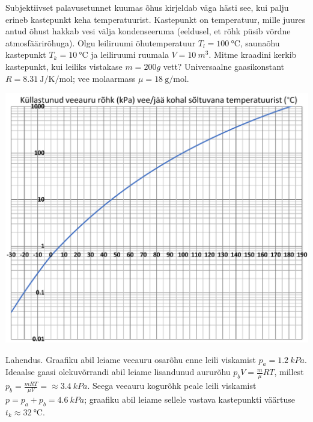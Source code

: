 
Subjektiivset palavusetunnet kuumas õhus kirjeldab väga hästi see, kui palju erineb kastepunkt keha temperatuurist. Kastepunkt on temperatuur, mille juures antud õhust hakkab vesi välja kondenseeruma (eeldusel, et rõhk püsib võrdne atmosfäärirõhuga). Olgu leiliruumi õhutemperatuur $T_l=\SI{100}{\celsius}$, saunaõhu kastepunkt $T_k=\SI{10}{\celsius}$ ja leiliruumi ruumala $V=\SI{10}{m^3}$. Mitme kraadini kerkib kastepunkt, kui leiliks vistakase $m=\SI{200}g$ vett? Universaalne gaasikonstant $R=\SI{8.31}{\joule\per\kelvin\per\mole}$; vee molaarmass $\mu=\SI{18}{\gram \per \mole}$.
\begin{center}
    \includegraphics[width=\textwidth]{2022-lahg-06-yl.pdf}
\end{center}




\hint

\solu
Lahendus. Graafiku abil leiame veeauru osarõhu enne leili viskamist $p_a=\SI{1.2}{kPa}$. Ideaalse gaasi olekuvõrrandi abil leiame lisandunud aururõhu $p_bV=\frac m\mu RT$, millest $p_b=\frac {mRT}{\mu V}=\approx \SI{3.4}{kPa}$. Seega veeauru kogurõhk peale leili viskamist $p=p_a+p_b=\SI{4.6}{kPa}$; graafiku abil leiame sellele vastava kastepunkti väärtuse $t_k\approx \SI{32}\celsius$.
\probend